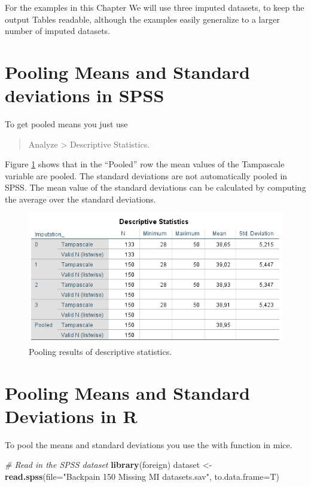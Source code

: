 \documentclass[]{book}
\newenvironment{Shaded}{\begin{snugshade}}{\end{snugshade}}
\newcommand{\KeywordTok}[1]{\textcolor[rgb]{0.13,0.29,0.53}{\textbf{#1}}}
\newcommand{\DataTypeTok}[1]{\textcolor[rgb]{0.13,0.29,0.53}{#1}}
\newcommand{\StringTok}[1]{\textcolor[rgb]{0.31,0.60,0.02}{#1}}
\newcommand{\CommentTok}[1]{\textcolor[rgb]{0.56,0.35,0.01}{\textit{#1}}}
\newcommand{\NormalTok}[1]{#1}
\begin{document}
For the examples in this Chapter We will use three imputed datasets, to
keep the output Tables readable, although the examples easily generalize
to a larger number of imputed datasets.

\section{Pooling Means and Standard deviations in
SPSS}\label{pooling-means-and-standard-deviations-in-spss}

To get pooled means you just use

\begin{quote}
Analyze \textgreater{} Descriptive Statistics.
\end{quote}

Figure \ref{fig:tab5-3} shows that in the ``Pooled'' row the mean values
of the Tampascale variable are pooled. The standard deviations are not
automatically pooled in SPSS. The mean value of the standard deviations
can be calculated by computing the average over the standard deviations.

\begin{figure}

{\centering \includegraphics[width=0.9\linewidth]{images/table5.3} 

}

\caption{Pooling results of descriptive statistics.}\label{fig:tab5-3}
\end{figure}

\section{Pooling Means and Standard Deviations in
R}\label{pooling-means-and-standard-deviations-in-r}

To pool the means and standard deviations you use the with function in
mice.

\begin{Shaded}
\begin{Highlighting}[]
\CommentTok{# Read in the SPSS dataset}
\KeywordTok{library}\NormalTok{(foreign)}
\NormalTok{dataset <-}\StringTok{ }\KeywordTok{read.spss}\NormalTok{(}\DataTypeTok{file=}\StringTok{"Backpain 150 Missing MI datasets.sav"}\NormalTok{, }\DataTypeTok{to.data.frame=}\NormalTok{T)}
\end{Highlighting}
\end{Shaded}
\end{document}
